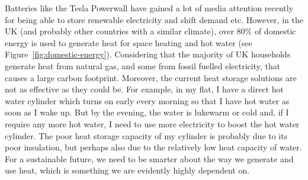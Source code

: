 Batteries like the Tesla Powerwall have gained a lot of media attention recently for being able to store renewable electricity and shift demand etc.
However, in the UK (and probably other countries with a similar climate), over 80\% of domestic energy is used to generate heat for space heating and hot water (see Figure~\ref{fig:domestic-energy}).
Considering that the majority of UK households generate heat from natural gas, and some from fossil fuelled electricity, that causes a large carbon footprint.
Moreover, the current heat storage solutions are not as effective as they could be.
For example, in my flat, I have a direct hot water cylinder which turns on early every morning so that I have hot water as soon as I wake up.
But by the evening, the water is lukewarm or cold and, if I require any more hot water, I need to use more electricity to boost the hot water cylinder.
The poor heat storage capacity of my cylinder is probably due to its poor insulation, but perhaps also due to the relatively low heat capacity of water.
For a sustainable future, we need to be smarter about the way we generate and use heat, which is something we are evidently highly dependent on.

